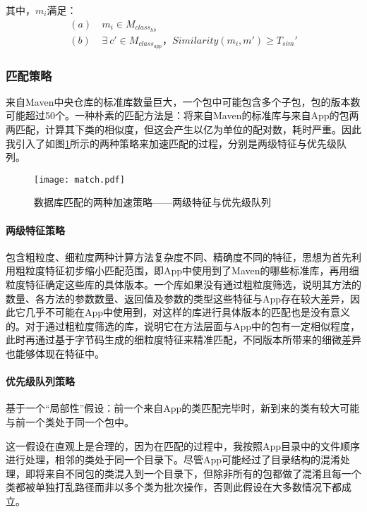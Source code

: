 其中，$m_i$满足：
\begin{subequations}
\begin{align}
(a)&\ m_i \in M_{class_{lib}}\\
(b)&\ \exists\  c'\in M_{class_{app}}，Similarity(m_i,m')\ge T_{sim}'
\end{align}
\end{subequations}



\subsubsection{匹配策略}

来自Maven中央仓库的标准库数量巨大，一个包中可能包含多个子包，包的版本数可能超过50个。一种朴素的匹配方法是：将来自Maven的标准库与来自App的包两两匹配，计算其下类的相似度，但这会产生以亿为单位的配对数，耗时严重。因此我引入了如图\ref{fig:match}所示的两种策略来加速匹配的过程，分别是两级特征与优先级队列。

\begin{figure}[!htp]
  \centering
  \texttt{[image: match.pdf]} \\
  \caption{数据库匹配的两种加速策略——两级特征与优先级队列}
 \label{fig:match}
\end{figure}


\paragraph{两级特征策略}包含粗粒度、细粒度两种计算方法复杂度不同、精确度不同的特征，思想为首先利用粗粒度特征初步缩小匹配范围，即App中使用到了Maven的哪些标准库，再用细粒度特征确定这些库的具体版本。一个库如果没有通过粗粒度筛选，说明其方法的数量、各方法的参数数量、返回值及参数的类型这些特征与App存在较大差异，因此它几乎不可能在App中使用到，对这样的库进行具体版本的匹配也是没有意义的。对于通过粗粒度筛选的库，说明它在方法层面与App中的包有一定相似程度，此时再通过基于字节码生成的细粒度特征来精准匹配，不同版本所带来的细微差异也能够体现在特征中。

\paragraph{优先级队列策略}基于一个“局部性”假设：{\kaishu 前一个来自App的类匹配完毕时，新到来的类有较大可能与前一个类处于同一个包中}。


这一假设在直观上是合理的，因为在匹配的过程中，我按照App目录中的文件顺序进行处理，相邻的类处于同一个目录下。尽管App可能经过了目录结构的混淆处理，即将来自不同包的类混入到一个目录下，但除非所有的包都做了混淆且每一个类都被单独打乱路径而非以多个类为批次操作，否则此假设在大多数情况下都成立。



